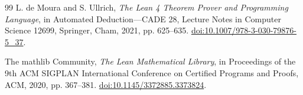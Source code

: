 \documentclass[11pt]{article}
\theoremstyle{definition}
\theoremstyle{remark}
\begin{document}
\begin{thebibliography}{99}
L. de Moura and S. Ullrich,
\emph{The Lean 4 Theorem Prover and Programming Language},
in Automated Deduction---CADE 28, Lecture Notes in Computer Science 12699,
Springer, Cham, 2021, pp. 625--635.
\href{https://doi.org/10.1007/978-3-030-79876-5_37}{doi:10.1007/978-3-030-79876-5\_37}.

The mathlib Community,
\emph{The Lean Mathematical Library},
in Proceedings of the 9th ACM SIGPLAN International Conference on Certified
Programs and Proofs, ACM, 2020, pp. 367--381.
\href{https://doi.org/10.1145/3372885.3373824}{doi:10.1145/3372885.3373824}.

\end{thebibliography}
\endgroup
\end{document}
